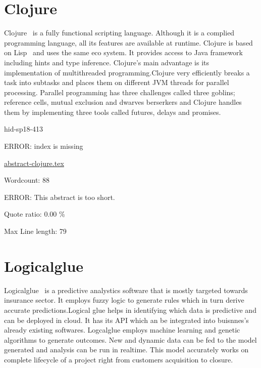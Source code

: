 \section{Clojure}

Clojure~\cite{hid-sp18-413-clojure} is a fully functional scripting
language. Although it is a complied programming language, all its features are
available at runtime. Clojure is based on Lisp~\cite{hid-sp18-413-lisp} and
uses the same eco system. It provides access to Java framework including hints
and type inference. Clojure’s main advantage is its implementation of
multithreaded programming.Clojure very efficiently breaks a task into subtasks
and places them on different JVM threads for parallel processing. Parallel
programming has three challenges called three goblins; reference cells, mutual
exclusion and dwarves berserkers and Clojure handles them by implementing three
tools called futures, delays and promises.


\begin{IU}

hid-sp18-413

ERROR: index is missing

\href{https://github.com/cloudmesh-community/hid-sp18-413/blob/master//technology/abstract-clojure.tex}{abstract-clojure.tex}

 

Wordcount: 88

ERROR: This abstract is too short.


Quote ratio: 0.00 \%
 
Max Line length: 79
\end{IU}

\section{Logicalglue}

Logicalglue~\cite{hid-sp18-413-logicalglue} is a predictive analystics software
that is mostly targeted towards insurance sector. It employs fuzzy logic to
generate rules which in turn derive accurate predictions.Logical glue helps in
identifying which data is predictive and can be deployed in cloud. It has its
API which an be integrated into buisnnes's already existing
softwares. Logcalglue employs machine learning and genetic algorithms to
generate outcomes. New and dynamic data can be fed to the model generated and
analysis can be run in realtime. This model accurately works on complete
lifecycle of a project right from customers acquisition to closure.



